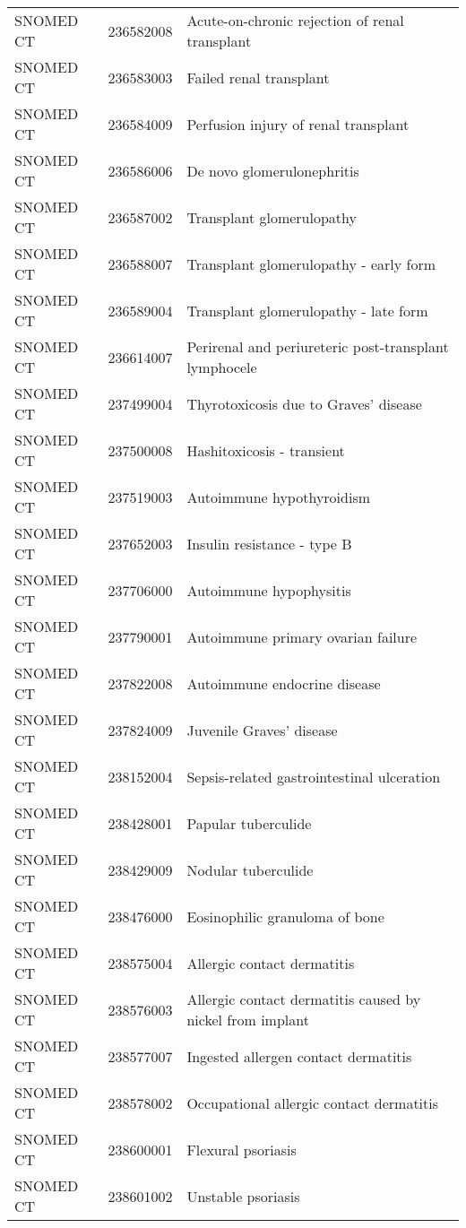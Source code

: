 \begin{longtable}{p{}p{}p{}}
  SNOMED CT & 236582008 & Acute-on-chronic rejection of renal transplant \\ 
  SNOMED CT & 236583003 & Failed renal transplant \\ 
  SNOMED CT & 236584009 & Perfusion injury of renal transplant \\ 
  SNOMED CT & 236586006 & De novo glomerulonephritis \\ 
  SNOMED CT & 236587002 & Transplant glomerulopathy \\ 
  SNOMED CT & 236588007 & Transplant glomerulopathy - early form \\ 
  SNOMED CT & 236589004 & Transplant glomerulopathy - late form \\ 
  SNOMED CT & 236614007 & Perirenal and periureteric post-transplant lymphocele \\ 
  SNOMED CT & 237499004 & Thyrotoxicosis due to Graves' disease \\ 
  SNOMED CT & 237500008 & Hashitoxicosis - transient \\ 
  SNOMED CT & 237519003 & Autoimmune hypothyroidism \\ 
  SNOMED CT & 237652003 & Insulin resistance - type B \\ 
  SNOMED CT & 237706000 & Autoimmune hypophysitis \\ 
  SNOMED CT & 237790001 & Autoimmune primary ovarian failure \\ 
  SNOMED CT & 237822008 & Autoimmune endocrine disease \\ 
  SNOMED CT & 237824009 & Juvenile Graves' disease \\ 
  SNOMED CT & 238152004 & Sepsis-related gastrointestinal ulceration \\ 
  SNOMED CT & 238428001 & Papular tuberculide \\ 
  SNOMED CT & 238429009 & Nodular tuberculide \\ 
  SNOMED CT & 238476000 & Eosinophilic granuloma of bone \\ 
  SNOMED CT & 238575004 & Allergic contact dermatitis \\ 
  SNOMED CT & 238576003 & Allergic contact dermatitis caused by nickel from implant \\ 
  SNOMED CT & 238577007 & Ingested allergen contact dermatitis \\ 
  SNOMED CT & 238578002 & Occupational allergic contact dermatitis \\ 
  SNOMED CT & 238600001 & Flexural psoriasis \\ 
  SNOMED CT & 238601002 & Unstable psoriasis \\ 

\end{longtable}
